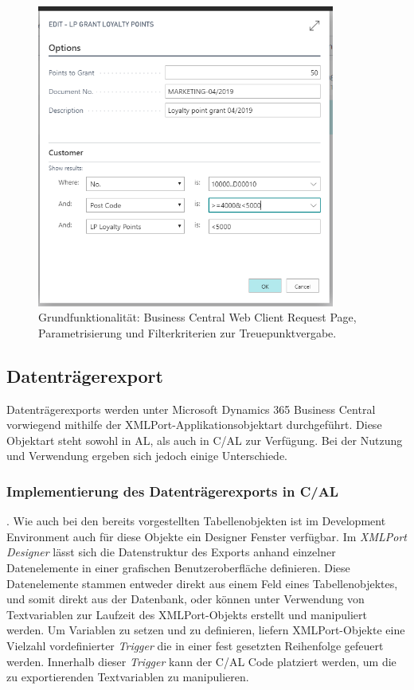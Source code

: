 \begin{figure}[h]
	\centering
	\includegraphics[width=98mm]{images/RequestPage}
	\caption{Grundfunktionalität: Business Central Web Client Request Page, Parametrisierung und Filterkriterien zur Treuepunktvergabe.}
	\label{fig:Request Page}
\end{figure}

\subsection{Datenträgerexport}
Datenträgerexports werden unter Microsoft Dynamics 365 Business Central vorwiegend mithilfe der XMLPort-Applikationsobjektart durchgeführt. Diese Objektart steht sowohl in AL, als auch in C/AL zur Verfügung. Bei der Nutzung und Verwendung ergeben sich jedoch einige Unterschiede.
\subsubsection{Implementierung des Datenträgerexports in C/AL}
. Wie auch bei den bereits vorgestellten Tabellenobjekten ist im Development Environment auch für diese Objekte ein Designer Fenster verfügbar. Im \textit{XMLPort Designer} lässt sich die Datenstruktur des Exports anhand einzelner Datenelemente in einer grafischen Benutzeroberfläche definieren. Diese Datenelemente stammen entweder direkt aus einem Feld eines Tabellenobjektes, und somit direkt aus der Datenbank, oder können unter Verwendung von Textvariablen zur Laufzeit des XMLPort-Objekts erstellt und manipuliert werden. Um Variablen zu setzen und zu definieren, liefern XMLPort-Objekte eine Vielzahl vordefinierter \textit{Trigger} die in einer fest gesetzten Reihenfolge gefeuert werden. Innerhalb dieser \textit{Trigger} kann der C/AL Code platziert werden, um die zu exportierenden Textvariablen zu manipulieren.


